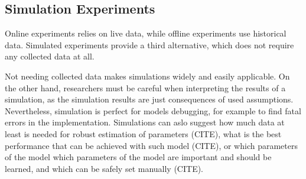 %
%
%

\subsection{Simulation Experiments}

Online experiments relies on live data,
while offline experiments use historical data.
Simulated experiments provide a third alternative,
  which does not require any collected data at all.

Not needing collected data makes simulations widely and easily applicable.
On the other hand, researchers must be careful when interpreting
  the results of a simulation, as the simulation results are %
  just consequences of used assumptions.
Nevertheless, simulation is perfect for models debugging,
  for example to find fatal errors in the implementation.
Simulations can aslo suggest
how much data at least is needed for robust estimation of parameters (CITE),
what is the best performance that can be achieved with such model (CITE),
or which parameters of the model which parameters of the model are important
and should be learned, and which can be safely set manually (CITE). %

